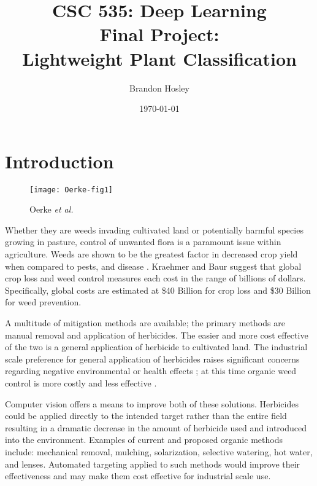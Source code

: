 \documentclass[]{article}
\title{CSC 535: Deep Learning \\ Final Project: \\ Lightweight Plant Classification}
\author{Brandon Hosley}
\date{\today}
\begin{document}
	\maketitle
	\clearpage
	
\begin{abstract}
	
\end{abstract}
	
\section{Introduction} 

\begin{wrapfigure}{r}{0.5\textwidth}
	\begin{center}
		\texttt{[image: Oerke-fig1]}
	\end{center}
	\caption{Oerke \emph{et al.}\cite{Oerke2006}}
\end{wrapfigure}
Whether they are weeds invading cultivated land or potentially harmful species growing in pasture, control of unwanted flora is a paramount issue within agriculture.
Weeds are shown to be the greatest factor in decreased crop yield when compared to pests, and disease
\cite{Oerke2006}\cite{Rao2000}\cite{Gianessi2007}.
Kraehmer and Baur \cite{WeedAnatomy2013}
suggest that global crop loss and weed control measures each cost in the range of billions of dollars.
Specifically, global costs are estimated at 
\$40 Billion \cite{Monaco2002} for crop loss and 
\$30 Billion \cite{Lawes2008} for weed prevention.

A multitude of mitigation methods are available; 
the primary methods are manual removal and application of herbicides.
The easier and more cost effective of the two is a general application of herbicide to cultivated land.
The industrial scale preference for general application of herbicides raises significant concerns regarding negative environmental or health effects \cite{Sopena2009};
at this time organic weed control is more costly and less effective \cite{Rood2002}.

Computer vision offers a means to improve both of these solutions.
Herbicides could be applied directly to the intended target rather than the entire field resulting in a dramatic decrease in the amount of herbicide used and introduced into the environment.
Examples of current and proposed organic methods include:
mechanical removal\cite{Chicouene2007}, 
mulching\cite{Riley2004},
solarization\cite{Sahile2005}\cite{Candido2011},
selective watering, 
hot water\cite{Pinel2000}, 
and lenses\cite{Johnson1989}.
Automated targeting applied to such methods would improve their effectiveness and 
may make them cost effective for industrial scale use.
\end{document}
